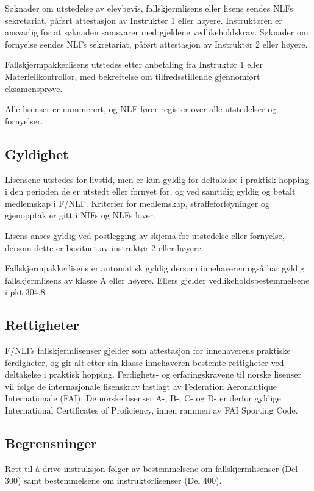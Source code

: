 Søknader om utstedelse av elevbevis, fallskjermlisens eller lisens sendes NLFs sekretariat, påført attestasjon av Instruktør 1 eller høyere. Instruktøren er ansvarlig for at søknaden samsvarer med gjeldene vedlikeholdskrav. Søknader om fornyelse sendes NLFs sekretariat, påført attestasjon av Instruktør 2 eller høyere.

Fallskjermpakkerlisens utstedes etter anbefaling fra Instruktør 1 eller Materiellkontrollør, med bekreftelse om tilfredsstillende gjennomført eksamensprøve.

Alle lisenser er nummerert, og NLF fører register over alle utstedelser og fornyelser.

\subsection{Gyldighet}
Lisensene utstedes for livstid, men er kun gyldig for deltakelse i praktisk hopping i den perioden de er utstedt eller fornyet for, og ved samtidig gyldig og betalt medlemskap i F/NLF. Kriterier for medlemskap, straffeforføyninger og gjenopptak er gitt i NIFs og NLFs lover.

Lisens anses gyldig ved postlegging av skjema for utstedelse eller fornyelse, dersom dette er bevitnet av instruktør 2 eller høyere.

Fallskjermpakkerlisens er automatisk gyldig dersom innehaveren også har gyldig fallskjermlisens av klasse A eller høyere. Ellers gjelder vedlikeholdsbestemmelsene i pkt 304.8.

\subsection{Rettigheter}
F/NLFs fallskjermlisenser gjelder som attestasjon for innehaverens praktiske ferdigheter, og gir alt etter sin klasse innehaveren bestemte rettigheter ved deltakelse i praktisk hopping. Ferdighets- og erfaringskravene til norske lisenser vil følge de internasjonale lisenskrav fastlagt av Federation Aeronautique Internationale (FAI). De norske lisenser A-, B-, C- og D- er derfor gyldige International Certificates of Proficiency, innen rammen av FAI Sporting Code.

\subsection{Begrensninger}
Rett til å drive instruksjon følger av bestemmelsene om fallskjermlisenser (Del 300) samt bestemmelsene om instruktørlisenser (Del 400).

